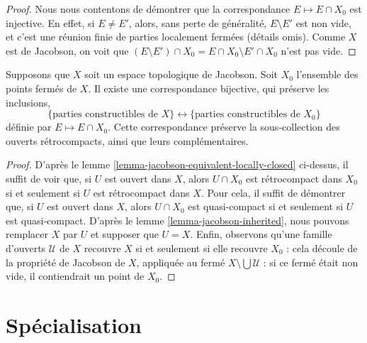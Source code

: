 \begin{proof}
Nous nous contentons de démontrer que la correspondance $E \mapsto E \cap X_0$ est injective.
En effet, si $E\neq E'$, alors, sans perte de généralité, $E\setminus E'$ est
non vide, et c'est une réunion finie de parties localement fermées (détails omis).
Comme $X$ est de Jacobson, on voit que
$(E \setminus E') \cap X_0 = E \cap X_0 \setminus E' \cap X_0$ n'est pas vide.
\end{proof}

\begin{lemma}
\label{lemma-jacobson-equivalent-constructible}
Supposons que $X$ soit un espace topologique de Jacobson.
Soit $X_0$ l'ensemble des points fermés de $X$.
Il existe une correspondance bijective, qui préserve les inclusions,
$$
\{\text{parties constructibles de } X\}
\leftrightarrow
\{\text{parties constructibles de } X_0\}
$$
définie par $E \mapsto E \cap X_0$. Cette correspondance préserve
la sous-collection des ouverts rétrocompacts, ainsi que leurs complémentaires.
\end{lemma}

\begin{proof}
D'après le lemme \ref{lemma-jacobson-equivalent-locally-closed} ci-dessus,
il suffit de voir que, si $U$ est ouvert dans $X$, alors $U\cap X_0$ est
rétrocompact dans $X_0$ si et seulement si $U$ est rétrocompact dans $X$.
Pour cela, il suffit de démontrer que, si $U$ est ouvert dans $X$, alors $U\cap X_0$ est
quasi-compact si et seulement si $U$ est quasi-compact.
D'après le lemme \ref{lemma-jacobson-inherited}, nous pouvons remplacer
$X$ par $U$ et supposer que $U = X$.
Enfin, observons qu'une famille d'ouverts $\mathcal{U}$ de $X$ recouvre
$X$ si et seulement si elle recouvre $X_0$ : cela découle de la propriété
de Jacobson de $X$, appliquée au fermé $X\setminus \bigcup \mathcal{U}$ :
si ce fermé était non vide, il contiendrait un point de $X_0$.
\end{proof}



















\section{Spécialisation}
\label{section-specialization}

